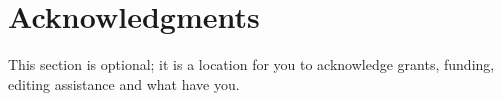 \documentclass{sig-alternate}
\begin{document}

\section{Acknowledgments}
This section is optional; it is a location for you
to acknowledge grants, funding, editing assistance and
what have you.

%

%
%

\end{document}
